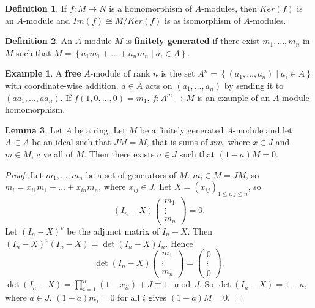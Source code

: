 \documentclass{article}
\newcommand{\rb}[1]{\left( #1 \right)}
\newcommand{\cb}[1]{\left\{ #1 \right\}}
\theoremstyle{definition}\newtheorem{definition}{Definition}[section]
\theoremstyle{definition}\newtheorem{remark}[definition]{Remark}
\theoremstyle{definition}\newtheorem*{example}{Example}
\theoremstyle{definition}\newtheorem*{note}{Note}
\newtheorem{lemma}[definition]{Lemma}
\begin{document}
\begin{definition}
If $ f : M \to N $ is a homomorphism of $ A $-modules, then $ Ker\rb{f} $ is an $ A $-module and $ Im\rb{f} \cong M / Ker\rb{f} $ is as isomorphism of $ A $-modules.
\end{definition}

\begin{definition}
An $ A $-module $ M $ is \textbf{finitely generated} if there exist $ m_1, \dots, m_n $ in $ M $ such that $ M = \cb{a_1m_1 + \dots + a_nm_n \mid a_i \in A} $.
\end{definition}

\begin{example}
A \textbf{free} $ A $-module of rank $ n $ is the set $ A^n = \cb{\rb{a_1, \dots, a_n} \mid a_i \in A} $ with coordinate-wise addition. $ a \in A $ acts on $ \rb{a_1, \dots, a_n} $ by sending it to $ \rb{aa_1, \dots, aa_n} $. If $ f\rb{1, 0, \dots, 0} = m_1 $, $ f : A^m \to M $ is an example of an $ A $-module homomorphism.
\end{example}

\begin{lemma}
\label{lem:8.7}
Let $ A $ be a ring. Let $ M $ be a finitely generated $ A $-module and let $ A \subset A $ be an ideal such that $ JM = M $, that is sums of $ xm $, where $ x \in J $ and $ m \in M $, give all of $ M $. Then there exists $ a \in J $ such that $ \rb{1 - a}M = 0 $.
\end{lemma}

\begin{proof}
Let $ m_1, \dots, m_n $ be a set of generators of $ M $. $ m_i \in M = JM $, so $ m_i = x_{i1}m_1 + \dots + x_{in}m_n $, where $ x_{ij} \in J $. Let $ X = \rb{x_{ij}}_{1 \le i, j \le n} $, so
$$ \rb{I_n - X}\begin{pmatrix} m_1 \\ \vdots \\ m_n \end{pmatrix} = 0. $$
Let $ \rb{I_n - X}^v $ be the adjunct matrix of $ I_n - X $. Then $ \rb{I_n - X}^v\rb{I_n - X} = \det\rb{I_n - X}I_n $. Hence
$$ \det\rb{I_n - X}\begin{pmatrix} m_1 \\ \vdots \\ m_n \end{pmatrix} = \begin{pmatrix} 0 \\ \vdots \\ 0 \end{pmatrix}. $$
$ \det\rb{I_n - X} = \prod_{i = 1}^n \rb{1 - x_{ii}} + J \equiv 1 \mod J $. So $ \det\rb{I_n - X} = 1 - a $, where $ a \in J $. $ \rb{1 - a}m_i = 0 $ for all $ i $ gives $ \rb{1 - a}M = 0 $.
\end{proof}
\end{document}
